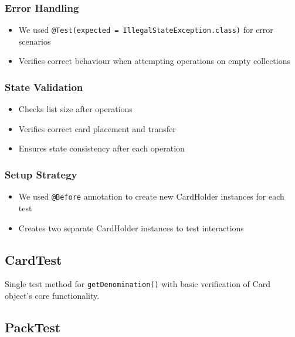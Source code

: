 \documentclass{article}
\begin{document}
\subsubsection{Error Handling}
\begin{itemize}
    \item We used \texttt{@Test(expected = IllegalStateException.class)} for error scenarios
    \item Verifies correct behaviour when attempting operations on empty collections
\end{itemize}

\subsubsection{State Validation}
\begin{itemize}
    \item Checks list size after operations
    \item Verifies correct card placement and transfer
    \item Ensures state consistency after each operation
\end{itemize}

\subsubsection{Setup Strategy}
\begin{itemize}
    \item We used \texttt{@Before} annotation to create new CardHolder instances for each test
    \item Creates two separate CardHolder instances to test interactions
\end{itemize}

\subsection{CardTest}
Single test method for \texttt{getDenomination()} with basic verification of Card object's core functionality.

\subsection{PackTest}
\end{document}
